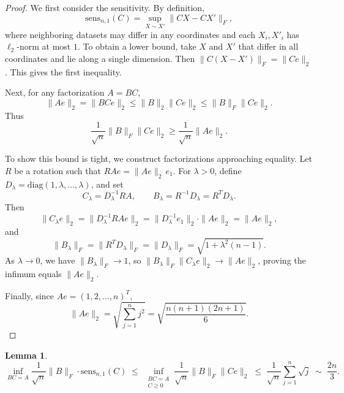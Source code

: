 \documentclass{article}
\theoremstyle{plain}
\newtheorem{lemma}[theorem]{Lemma}
\theoremstyle{definition}
\theoremstyle{remark}
\begin{document}
\begin{proof}

We first consider the sensitivity. By definition,
\begin{equation}
    \mathrm{sens}_{n,1}(C)
    = \sup_{X \sim X'} \|CX - CX'\|_F,
\end{equation}
where neighboring datasets may differ in any coordinates and each
$X_i, X'_i$ has $\ell_2$-norm at most $1$.
To obtain a lower bound, take $X$ and $X'$ that differ in all coordinates
and lie along a single dimension. Then $\|C(X-X')\|_F = \|Ce\|_2$. This gives the first inequality.

Next, for any factorization $A = BC$,
\begin{equation}
    \|Ae\|_2
    = \|BCe\|_2
    \le \|B\|_2 \|Ce\|_2
    \le \|B\|_F \|Ce\|_2.
\end{equation}
Thus
\begin{equation}
    \frac{1}{\sqrt{n}}\|B\|_F \|Ce\|_2
    \ge \frac{1}{\sqrt{n}}\|Ae\|_2.
\end{equation}

To show this bound is tight, we construct factorizations approaching equality.
Let $R$ be a rotation such that $RAe = \|Ae\|_2\, e_1$. For $\lambda > 0$, define $D_\lambda = \mathrm{diag}(1, \lambda, \ldots, \lambda)$,
and set
\begin{equation}
    C_\lambda = D_\lambda^{-1} R A,
    \qquad
    B_\lambda = R^{-1} D_\lambda  = R^{T}D_\lambda.
\end{equation}
Then
\begin{equation}
    \|C_\lambda e\|_2
    = \|D_\lambda^{-1} R Ae\|_2
    = \|D_\lambda^{-1} e_1\|_2 \cdot \|Ae\|_2
    = \|Ae\|_2,
\end{equation}
and
\begin{equation}
    \|B_\lambda\|_F
    = \|R^{T} D_\lambda \|_F
    = \|D_\lambda\|_F
    = \sqrt{1 + \lambda^2 (n-1)}.
\end{equation}
As $\lambda \to 0$, we have $\|B_\lambda\|_F \to 1$, so $\|B_\lambda\|_F \|C_\lambda e\|_2 \to \|Ae\|_2$,
proving the infimum equals $\|Ae\|_2$.

Finally, since $Ae = (1,2,\ldots,n)^T$,
\begin{equation}
    \|Ae\|_2
    = \sqrt{\sum_{j=1}^n j^2}
    = \sqrt{\frac{n(n+1)(2n+1)}{6}}.
\end{equation}

\end{proof}


\begin{lemma}
\begin{equation}
    \inf_{BC=A}\frac{1}{\sqrt{n}}\|B\|_F \cdot \mathrm{sens}_{n,1}(C)
    \;\le\;
    \inf_{\substack{BC=A \\ C \ge 0}}
        \frac{1}{\sqrt{n}}\|B\|_F \|Ce\|_2
    \;\le\;
    \frac{1}{\sqrt{n}} \sum_{j=1}^{n} \sqrt{j}
    \;\sim\;
    \frac{2n}{3}.
\end{equation}
\end{lemma}
\end{document}
